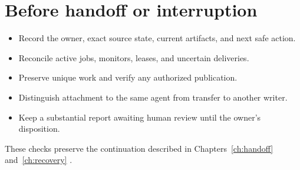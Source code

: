 \section{Before handoff or interruption}
\begin{itemize}[label=$\square$]
  \item Record the owner, exact source state, current artifacts, and next safe action.
  \item Reconcile active jobs, monitors, leases, and uncertain deliveries.
  \item Preserve unique work and verify any authorized publication.
  \item Distinguish attachment to the same agent from transfer to another writer.
  \item Keep a substantial report awaiting human review until the owner's disposition.
\end{itemize}
These checks preserve the continuation described in Chapters~\ref{ch:handoff}
and~\ref{ch:recovery}
\cites[Commit and hand off]{skill:git}[Recover harness context, then verify it]{skill:recovery}.

